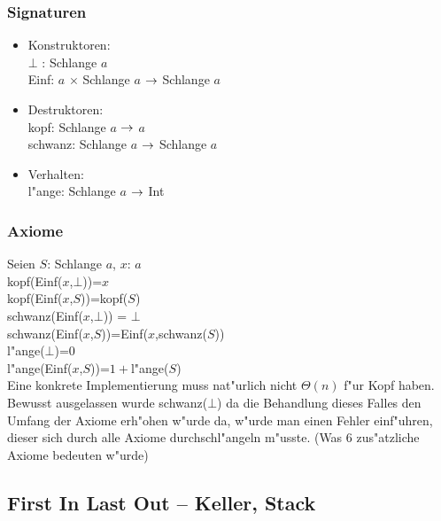 \documentclass[a4paper]{scrartcl}
\begin{document}

\subsubsection*{Signaturen}
\begin{itemize}
	\item Konstruktoren:\\
$\bot$ : Schlange $a$\\
Einf: $a$ $\times$ Schlange $a$ $\rightarrow$ Schlange $a$

	\item Destruktoren:\\
kopf: Schlange $a$ $\rightarrow$ $a$\\
schwanz: Schlange $a$ $\rightarrow$ Schlange $a$
	
	\item Verhalten:\\
l"ange: Schlange $a$ $\rightarrow$ Int\\
\end{itemize}
\subsubsection*{Axiome}
Seien $S$: Schlange $a$, $x$: $a$\\
kopf(Einf($x$,$\bot$))=$x$\\
kopf(Einf($x$,$S$))=kopf($S$)\\
schwanz(Einf($x$,$\bot$)) = $\bot$\\
schwanz(Einf($x$,$S$))=Einf($x$,schwanz($S$))\\
l"ange($\bot$)=$0$\\
l"ange(Einf($x$,$S$))=$1+$l"ange($S$)\\

Eine konkrete Implementierung muss nat"urlich nicht $\Theta(n)$ f"ur Kopf haben.\\

Bewusst ausgelassen wurde schwanz($\bot$) da die Behandlung dieses Falles den Umfang der Axiome erh"ohen w"urde da, w"urde man einen Fehler einf"uhren, dieser sich durch alle Axiome durchschl"angeln m"usste. (Was 6 zus"atzliche Axiome bedeuten w"urde)

\subsection{First In Last Out -- Keller, Stack}
\end{document}
